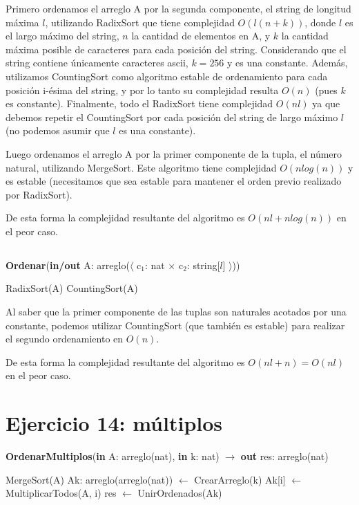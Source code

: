 Primero ordenamos el arreglo A por la segunda componente, el string de longitud máxima $l$, utilizando RadixSort que tiene complejidad $O(l(n + k))$, donde $l$ es el largo máximo del string, $n$ la cantidad de elementos en A, y $k$ la cantidad máxima posible de caracteres para cada posición del string. Considerando que el string contiene únicamente caracteres ascii, $k=256$ y es una constante. Además, utilizamos CountingSort como algoritmo estable de ordenamiento para cada posición i-ésima del string, y por lo tanto su complejidad resulta $O(n)$ (pues $k$ es constante). Finalmente, todo el RadixSort tiene complejidad $O(nl)$ ya que debemos repetir el CountingSort por cada posición del string de largo máximo $l$ (no podemos asumir que $l$ es una constante).

Luego ordenamos el arreglo A por la primer componente de la tupla, el número natural, utilizando MergeSort. Este algoritmo tiene complejidad $O(n log(n))$ y es estable (necesitamos que sea estable para mantener el orden previo realizado por RadixSort).

De esta forma la complejidad resultante del algoritmo es $O(nl + n log(n))$ en el peor caso.

\subsection{}

\begin{algorithm}[H]
\caption{
    \textbf{Ordenar}(\textbf{in/out} A: arreglo($\langle$ c$_1$: nat × c$_2$: string[$l$] $\rangle$))
}
\begin{algorithmic}[1]
    \State RadixSort(A) 
    \State CountingSort(A) 
\end{algorithmic}
\end{algorithm}

Al saber que la primer componente de las tuplas son naturales acotados por una constante, podemos utilizar CountingSort (que también es estable) para realizar el segundo ordenamiento en $O(n)$.

De esta forma la complejidad resultante del algoritmo es $O(nl + n) = O(nl)$ en el peor caso.

\section{Ejercicio 14: múltiplos}

\begin{algorithm}[H]
\caption{
    \textbf{OrdenarMultiplos}(\textbf{in} A: arreglo(nat), \textbf{in} k: nat) $\to$ \textbf{out} res: arreglo(nat)
}
\begin{algorithmic}[1]
    \State MergeSort(A) 
    \State Ak: arreglo(arreglo(nat)) $\gets$ CrearArreglo(k) 
     
        \State Ak[i] $\gets$ MultiplicarTodos(A, i) 
    \EndFor
    \State res $\gets$ UnirOrdenados(Ak) 
\end{algorithmic}
\end{algorithm}

